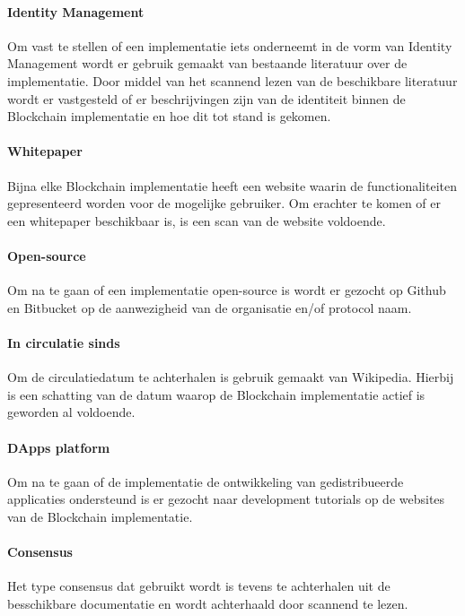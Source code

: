 \paragraph{Identity Management}
Om vast te stellen of een implementatie iets onderneemt in de vorm van Identity Management wordt er gebruik gemaakt van bestaande literatuur over de implementatie. Door middel van het scannend lezen van de beschikbare literatuur wordt er vastgesteld of er beschrijvingen zijn van de identiteit binnen de Blockchain implementatie en hoe dit tot stand is gekomen.

\paragraph{Whitepaper}
Bijna elke Blockchain implementatie heeft een website waarin de functionaliteiten gepresenteerd worden voor de mogelijke gebruiker. Om erachter te komen of er een whitepaper beschikbaar is, is een scan van de website voldoende.

\paragraph{Open-source}
Om na te gaan of een implementatie open-source is wordt er gezocht op Github en Bitbucket op de aanwezigheid van de organisatie en/of protocol naam.

\paragraph{In circulatie sinds}

Om de circulatiedatum te achterhalen is gebruik gemaakt van Wikipedia. Hierbij is een schatting van de datum waarop de Blockchain implementatie actief is geworden al voldoende.

\paragraph{DApps platform}

Om na te gaan of de implementatie de ontwikkeling van gedistribueerde applicaties ondersteund is er gezocht naar development tutorials op de websites van de Blockchain implementatie.

\paragraph{Consensus}

Het type consensus dat gebruikt wordt is tevens te achterhalen uit de besschikbare documentatie en wordt achterhaald door scannend te lezen.

